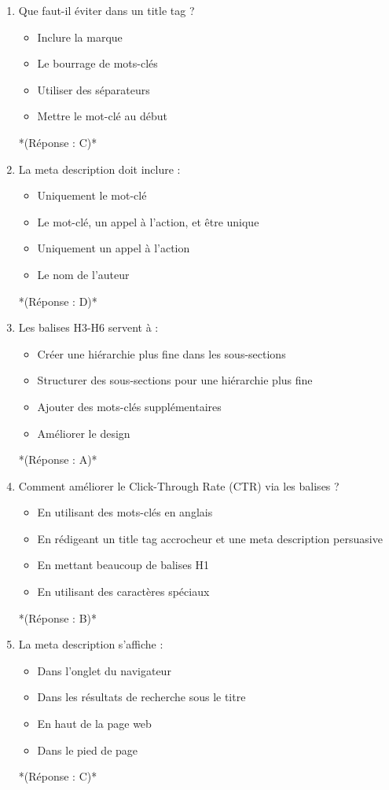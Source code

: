 \documentclass[12pt,a4paper,twoside]{report}
\begin{document}
\begin{enumerate}
\item Que faut-il éviter dans un title tag ?
\begin{itemize}
\item[A)] Inclure la marque
\item[B)] Le bourrage de mots-clés
\item[C)] Utiliser des séparateurs
\item[D)] Mettre le mot-clé au début
\end{itemize}
*(Réponse : C)*

\item La meta description doit inclure :
\begin{itemize}
\item[A)] Uniquement le mot-clé
\item[B)] Le mot-clé, un appel à l'action, et être unique
\item[C)] Uniquement un appel à l'action
\item[D)] Le nom de l'auteur
\end{itemize}
*(Réponse : D)*

\item Les balises H3-H6 servent à :
\begin{itemize}
\item[A)] Créer une hiérarchie plus fine dans les sous-sections
\item[B)] Structurer des sous-sections pour une hiérarchie plus fine
\item[C)] Ajouter des mots-clés supplémentaires
\item[D)] Améliorer le design
\end{itemize}
*(Réponse : A)*

\item Comment améliorer le Click-Through Rate (CTR) via les balises ?
\begin{itemize}
\item[A)] En utilisant des mots-clés en anglais
\item[B)] En rédigeant un title tag accrocheur et une meta description persuasive
\item[C)] En mettant beaucoup de balises H1
\item[D)] En utilisant des caractères spéciaux
\end{itemize}
*(Réponse : B)*

\item La meta description s'affiche :
\begin{itemize}
\item[A)] Dans l'onglet du navigateur
\item[B)] Dans les résultats de recherche sous le titre
\item[C)] En haut de la page web
\item[D)] Dans le pied de page
\end{itemize}
*(Réponse : C)*


\end{enumerate}
\end{document}
